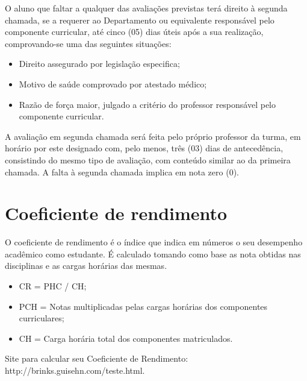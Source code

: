 O aluno que faltar a qualquer das avaliações previstas terá direito à segunda chamada, se a requerer ao Departamento ou equivalente responsável pelo componente curricular, até cinco (05) dias úteis após a sua realização, comprovando-se uma das seguintes situações:
    \begin{itemize}
        \item Direito assegurado por legislação especifica;
        \item Motivo de saúde comprovado por atestado médico;
        \item Razão de força maior, julgado a critério do professor responsável pelo componente curricular.
    \end{itemize}
    A avaliação em segunda chamada será feita pelo próprio professor da turma, em horário por este designado com, pelo menos, três (03) dias de antecedência, consistindo do mesmo tipo de avaliação, com conteúdo similar ao da primeira chamada. A falta à segunda chamada implica em nota zero (0).
    
\section{Coeficiente de rendimento} 

O coeficiente de rendimento é o índice que indica em números o seu desempenho acadêmico como estudante. É calculado tomando como base as nota obtidas nas disciplinas e as cargas horárias das mesmas.
\begin{itemize}
    \item CR =  PHC / CH;
    \item PCH = Notas multiplicadas pelas cargas horárias dos componentes curriculares;
    \item CH = Carga horária total dos componentes matriculados.
\end{itemize}
Site para calcular seu Coeficiente de Rendimento: http://brinks.guisehn.com/teste.html.
